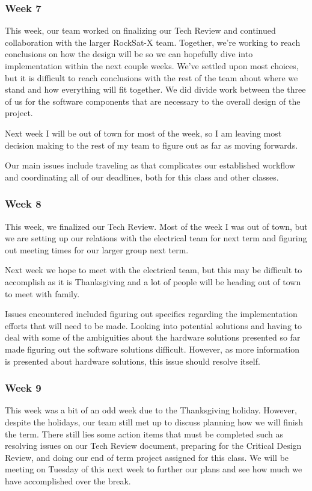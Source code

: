\documentclass[letterpaper,10pt]{article}
\begin{document}
\subsubsection{Week 7}
This week, our team worked on finalizing our Tech Review and continued collaboration with the larger RockSat-X team. 
Together, we're working to reach conclusions on how the design will be so we can hopefully dive into implementation 
within the next couple weeks. We've settled upon most choices, but it is difficult to reach conclusions with the rest 
of the team about where we stand and how everything will fit together. We did divide work between the three of us
for the software components that are necessary to the overall design of the project. 

Next week I will be out of town for most of the week, so I am leaving most decision making to the rest of my team to 
figure out as far as moving forwards.

Our main issues include traveling as that complicates our established workflow and coordinating all of our deadlines,
both for this class and other classes.

\subsubsection{Week 8}
This week, we finalized our Tech Review. Most of the week I was out of town, but we are setting up our relations with 
the electrical team for next term and figuring out meeting times for our larger group next term.

Next week we hope to meet with the electrical team, but this may be difficult to accomplish as it is Thanksgiving
and a lot of people will be heading out of town to meet with family.

Issues encountered included figuring out specifics regarding the implementation efforts that will need to be made.
Looking into potential solutions and having to deal with some of the ambiguities about the hardware solutions
presented so far made figuring out the software solutions difficult. However, as more information is
presented about hardware solutions, this issue should resolve itself.

\subsubsection{Week 9}
This week was a bit of an odd week due to the Thanksgiving holiday. However, despite the holidays, our team still met 
up to discuss planning how we will finish the term. There still lies some action items that must be completed such as 
resolving issues on our Tech Review document, preparing for the Critical Design Review, and doing our end of term 
project assigned for this class. We will be meeting on Tuesday of this next week to further our plans and see how 
much we have accomplished over the break.
\end{document}

